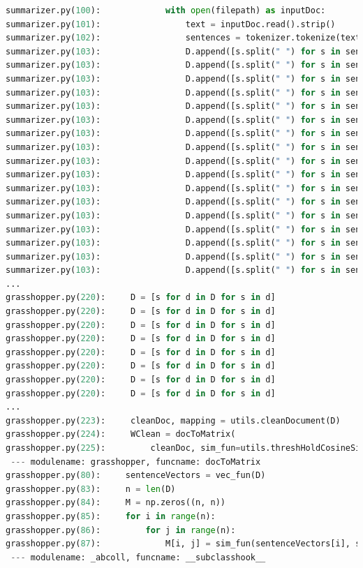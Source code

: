\documentclass[11pt]{article}
\begin{document}
\begin{lstlisting}[breaklines,language=Python]
summarizer.py(100):             with open(filepath) as inputDoc:
summarizer.py(101):                 text = inputDoc.read().strip()
summarizer.py(102):                 sentences = tokenizer.tokenize(text)
summarizer.py(103):                 D.append([s.split(" ") for s in sentences])
summarizer.py(103):                 D.append([s.split(" ") for s in sentences])
summarizer.py(103):                 D.append([s.split(" ") for s in sentences])
summarizer.py(103):                 D.append([s.split(" ") for s in sentences])
summarizer.py(103):                 D.append([s.split(" ") for s in sentences])
summarizer.py(103):                 D.append([s.split(" ") for s in sentences])
summarizer.py(103):                 D.append([s.split(" ") for s in sentences])
summarizer.py(103):                 D.append([s.split(" ") for s in sentences])
summarizer.py(103):                 D.append([s.split(" ") for s in sentences])
summarizer.py(103):                 D.append([s.split(" ") for s in sentences])
summarizer.py(103):                 D.append([s.split(" ") for s in sentences])
summarizer.py(103):                 D.append([s.split(" ") for s in sentences])
summarizer.py(103):                 D.append([s.split(" ") for s in sentences])
summarizer.py(103):                 D.append([s.split(" ") for s in sentences])
summarizer.py(103):                 D.append([s.split(" ") for s in sentences])
summarizer.py(103):                 D.append([s.split(" ") for s in sentences])
summarizer.py(103):                 D.append([s.split(" ") for s in sentences])
...
grasshopper.py(220):     D = [s for d in D for s in d]
grasshopper.py(220):     D = [s for d in D for s in d]
grasshopper.py(220):     D = [s for d in D for s in d]
grasshopper.py(220):     D = [s for d in D for s in d]
grasshopper.py(220):     D = [s for d in D for s in d]
grasshopper.py(220):     D = [s for d in D for s in d]
grasshopper.py(220):     D = [s for d in D for s in d]
grasshopper.py(220):     D = [s for d in D for s in d]
...
grasshopper.py(223):     cleanDoc, mapping = utils.cleanDocument(D)
grasshopper.py(224):     WClean = docToMatrix(
grasshopper.py(225):         cleanDoc, sim_fun=utils.threshHoldCosineSim)
 --- modulename: grasshopper, funcname: docToMatrix
grasshopper.py(80):     sentenceVectors = vec_fun(D)
grasshopper.py(83):     n = len(D)
grasshopper.py(84):     M = np.zeros((n, n))
grasshopper.py(85):     for i in range(n):
grasshopper.py(86):         for j in range(n):
grasshopper.py(87):             M[i, j] = sim_fun(sentenceVectors[i], sentenceVectors[j])
 --- modulename: _abcoll, funcname: __subclasshook__

\end{lstlisting}
\end{document}
